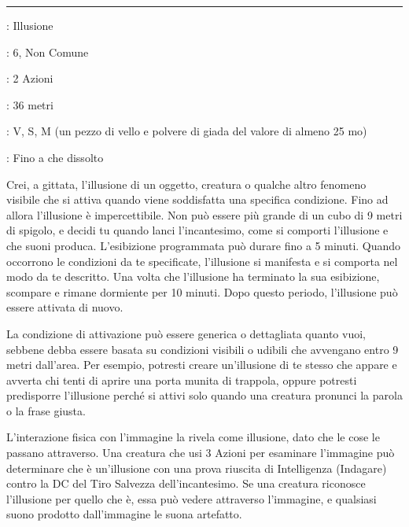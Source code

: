 \begin{multicols}{2}
\smallskip\noindent\rule{\linewidth}{2pt} \hypertarget{Illusione Programmata}{}\smallskip{}
\noindent
\begin{description}[noitemsep, topsep=0pt, parsep=0pt, partopsep=0pt, leftmargin=0cm, labelwidth=2.8cm]
	\item[\textbf{Lista di Magia}]: Illusione
	\item[\textbf{Livello}]: 6, Non Comune
	\item[\textbf{T. di Lancio}]: 2 Azioni
	\item[\textbf{Gittata}]: 36 metri
	\item[\textbf{Componenti}]: V, S, M (un pezzo di vello e polvere di giada del valore di almeno 25 mo)
	\item[\textbf{Durata}]: Fino a che dissolto
\end{description}

Crei, a gittata, l'illusione di un oggetto, creatura o qualche altro fenomeno visibile che si attiva quando viene soddisfatta una specifica condizione. Fino ad allora l'illusione è impercettibile. Non può essere più grande di un cubo di 9 metri di spigolo, e decidi tu quando lanci l'incantesimo, come si comporti l'illusione e che suoni produca. L'esibizione programmata può durare fino a 5 minuti. Quando occorrono le condizioni da te specificate, l'illusione si manifesta e si comporta nel modo da te descritto. Una volta che l'illusione ha terminato la sua esibizione, scompare e rimane dormiente per 10 minuti. Dopo questo periodo, l'illusione può essere attivata di nuovo.

La condizione di attivazione può essere generica o dettagliata quanto vuoi, sebbene debba essere basata su condizioni visibili o udibili che avvengano entro 9 metri dall'area. Per esempio, potresti creare un'illusione di te stesso che appare e avverta chi tenti di aprire una porta munita di trappola, oppure potresti predisporre l'illusione perché si attivi solo quando una creatura pronunci la parola o la frase giusta.

L'interazione fisica con l'immagine la rivela come illusione, dato che le cose le passano attraverso. Una creatura che usi 3 Azioni per esaminare l'immagine può determinare che è un'illusione con una prova riuscita di Intelligenza (Indagare) contro la DC del Tiro Salvezza dell'incantesimo. Se una creatura riconosce l'illusione per quello che è, essa può vedere attraverso l'immagine, e qualsiasi suono prodotto dall'immagine le suona artefatto.


\end{multicols}
